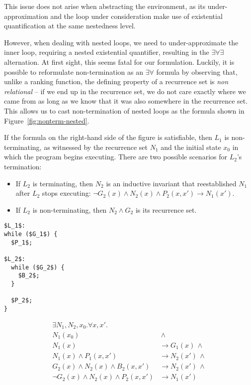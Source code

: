 \documentclass[preprint]{sigplanconf}
\theoremstyle{definition}
\begin{document}
This issue does not arise when abstracting the environment, as its
under-approximation and the loop under consideration make use of existential
quantification at the same nestedness level.

However, when dealing with nested loops, we need to under-approximate the
inner loop, requiring a nested existential quantifier, resulting in the
$\exists \forall \exists$ alternation.  At first sight, this seems fatal for
our formulation.  Luckily, it is possible to reformulate non-termination as
an $\exists \forall$ formula by observing that, unlike a ranking function,
the defining property of a recurrence set is \emph{non relational} -- if we
end up in the recurrence set, we do not care exactly where we came from as
long as we know that it was also somewhere in the recurrence set.  This
allows us to cast non-termination of nested loops as the formula shown in
Figure~\ref{fig:nonterm-nested}.

If the formula on the right-hand side of the figure is satisfiable, then
$L_1$ is non-terminating, as witnessed by the recurrence set $N_1$ and the
initial state $x_0$ in which the program begins executing.  There are two
possible scenarios for $L_2$'s termination:
%
\begin{itemize}
%
\item If $L_2$ is terminating, then $N_2$ is an inductive invariant that
reestablished $N_1$ after $L_2$ stops executing: $\lnot G_2(x) \wedge N_2(x)
\wedge P_2(x,x') \rightarrow N_1(x') $.
%
\item If $L_2$ is non-terminating, then $N_2 \wedge G_2$ is its recurrence set.
%
\end{itemize}

\begin{figure*}
\begin{framed}
 \begin{minipage}{0.19\textwidth}
\begin{lstlisting}[mathescape=true]
$L_1$:
while ($G_1$) {
  $P_1$;

$L_2$:
  while ($G_2$) {
    $B_2$;
  }

  $P_2$;
}
\end{lstlisting}
\end{minipage}
\vline
\begin{minipage}{0.82\textwidth}
\begin{align*}
 \exists N_1, N_2, x_0 . \forall x, x' . \\
  N_1(x_0) & \, \wedge \\
  N_1(x) & \rightarrow G_1(x) \, \wedge \\
  N_1(x) \wedge P_1(x,x') & \rightarrow N_2(x') \, \wedge \\
  G_2(x) \wedge N_2(x) \wedge B_2(x,x') & \rightarrow N_2(x') \, \wedge \\
  \lnot G_2(x) \wedge N_2(x) \wedge P_2(x,x') & \rightarrow N_1(x') 
\end{align*}
\end{minipage}
\end{framed}

\caption{The non-termination formula for nested loops \label{fig:nonterm-nested}}
\end{figure*}
\end{document}
